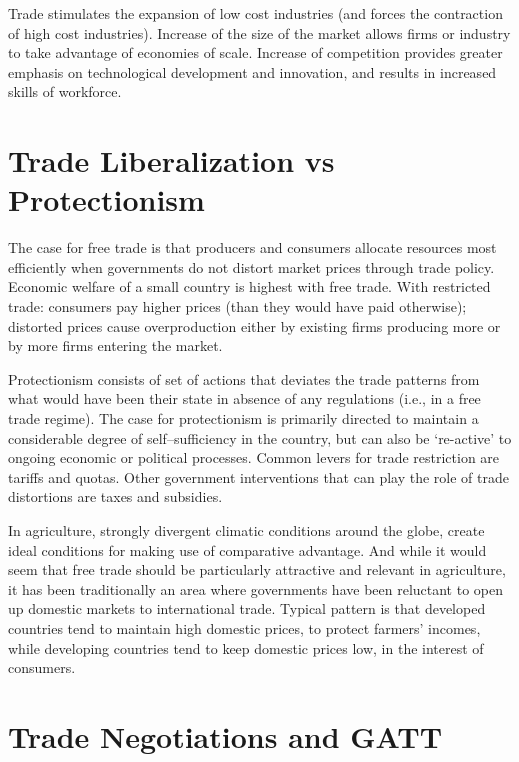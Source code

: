 \documentclass[
]{book}
\begin{document}
Trade stimulates the expansion of low cost industries (and forces the contraction of high cost industries). Increase of the size of the market allows firms or industry to take advantage of economies of scale. Increase of competition provides greater emphasis on technological development and innovation, and results in increased skills of workforce.

\hypertarget{trade-liberalization-vs-protectionism}{%
\section{Trade Liberalization vs Protectionism}\label{trade-liberalization-vs-protectionism}}

The case for free trade is that producers and consumers allocate resources most efficiently when governments do not distort market prices through trade policy. Economic welfare of a small country is highest with free trade. With restricted trade: consumers pay higher prices (than they would have paid otherwise); distorted prices cause overproduction either by existing firms producing more or by more firms entering the market.

Protectionism consists of set of actions that deviates the trade patterns from what would have been their state in absence of any regulations (i.e., in a free trade regime). The case for protectionism is primarily directed to maintain a considerable degree of self--sufficiency in the country, but can also be `re-active' to ongoing economic or political processes. Common levers for trade restriction are tariffs and quotas. Other government interventions that can play the role of trade distortions are taxes and subsidies.

In agriculture, strongly divergent climatic conditions around the globe, create ideal conditions for making use of comparative advantage. And while it would seem that free trade should be particularly attractive and relevant in agriculture, it has been traditionally an area where governments have been reluctant to open up domestic markets to international trade. Typical pattern is that developed countries tend to maintain high domestic prices, to protect farmers' incomes, while developing countries tend to keep domestic prices low, in the interest of consumers.

\hypertarget{trade-negotiations-and-gatt}{%
\section{Trade Negotiations and GATT}\label{trade-negotiations-and-gatt}}
\end{document}
